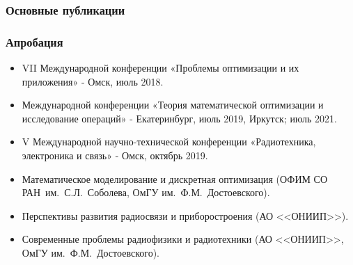 
 \begin{frame}[t,allowframebreaks] %
    \frametitle{Основные публикации}
    \nocite{tyu:daor}%
    \nocite{tyu22:reis}%
    \nocite{tyu:jphys}%
    \nocite{tyu:motor}%
\end{frame}

\begin{frame}
    \frametitle{Апробация}
    \begin{itemize}
      \item VII Международной конференции «Проблемы оптимизации и их приложения» - Омск, июль 2018.
      \item Международной конференции «Теория математической оптимизации и исследование операций» - Екатеринбург, июль 2019, Иркутск; июль 2021.
      \item V Международной научно-технической конференции «Радиотехника, электроника и связь» - Омск, октябрь 2019.
      \item Математическое моделирование и дискретная оптимизация (ОФИМ СО РАН~им.~С.Л.~Соболева, ОмГУ им.~Ф.М.~Достоевского).
      \item Перспективы развития радиосвязи и приборостроения (АО <<ОНИИП>>).
      \item Современные проблемы радиофизики и радиотехники (АО <<ОНИИП>>, ОмГУ им.~Ф.М.~Достоевского).
    \end{itemize}
\end{frame}

